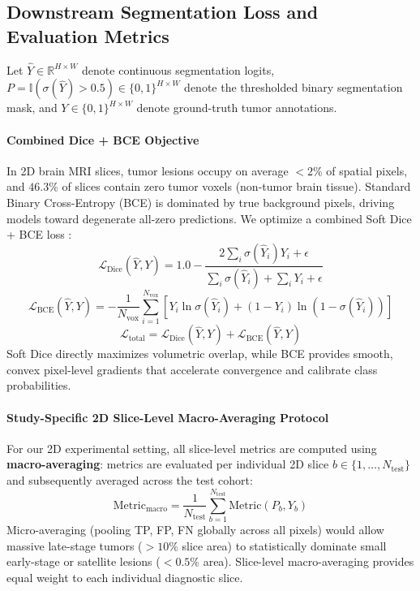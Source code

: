 \documentclass{article}
\begin{document}
\subsection{Downstream Segmentation Loss and Evaluation Metrics}

Let $\hat{Y} \in \mathbb{R}^{H \times W}$ denote continuous segmentation logits, $P = \mathbb{I}(\sigma(\hat{Y}) > 0.5) \in \{0, 1\}^{H \times W}$ denote the thresholded binary segmentation mask, and $Y \in \{0, 1\}^{H \times W}$ denote ground-truth tumor annotations.

\paragraph{Combined Dice + BCE Objective}
In 2D brain MRI slices, tumor lesions occupy on average $< 2\%$ of spatial pixels, and $46.3\%$ of slices contain zero tumor voxels (non-tumor brain tissue). Standard Binary Cross-Entropy (BCE) is dominated by true background pixels, driving models toward degenerate all-zero predictions. We optimize a combined Soft Dice + BCE loss \citep{milletari2016vnet,isensee2021nnunet}:
\begin{equation}
    \mathcal{L}_{\text{Dice}}(\hat{Y}, Y) = 1.0 - \frac{2 \sum_{i} \sigma(\hat{Y}_i) Y_i + \epsilon}{\sum_{i} \sigma(\hat{Y}_i) + \sum_{i} Y_i + \epsilon}
\end{equation}
\begin{equation}
    \mathcal{L}_{\text{BCE}}(\hat{Y}, Y) = - \frac{1}{N_{\text{vox}}} \sum_{i=1}^{N_{\text{vox}}} \left[ Y_i \ln \sigma(\hat{Y}_i) + (1 - Y_i) \ln(1 - \sigma(\hat{Y}_i)) \right]
\end{equation}
\begin{equation}
    \mathcal{L}_{\text{total}} = \mathcal{L}_{\text{Dice}}(\hat{Y}, Y) + \mathcal{L}_{\text{BCE}}(\hat{Y}, Y)
\end{equation}
Soft Dice directly maximizes volumetric overlap, while BCE provides smooth, convex pixel-level gradients that accelerate convergence and calibrate class probabilities.

\paragraph{Study-Specific 2D Slice-Level Macro-Averaging Protocol}
For our 2D experimental setting, all slice-level metrics are computed using \textbf{macro-averaging}: metrics are evaluated per individual 2D slice $b \in \{1, \dots, N_{\text{test}}\}$ and subsequently averaged across the test cohort:
\begin{equation}
    \text{Metric}_{\text{macro}} = \frac{1}{N_{\text{test}}} \sum_{b=1}^{N_{\text{test}}} \text{Metric}(P_b, Y_b)
\end{equation}
Micro-averaging (pooling TP, FP, FN globally across all pixels) would allow massive late-stage tumors ($> 10\%$ slice area) to statistically dominate small early-stage or satellite lesions ($< 0.5\%$ area). Slice-level macro-averaging provides equal weight to each individual diagnostic slice.
\end{document}
